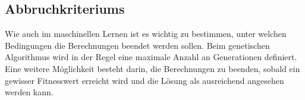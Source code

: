 %
%
%
%
\subsection{Abbruchkriteriums
\label{genetic_algorithm:termination}}
Wie auch im maschinellen Lernen ist es wichtig zu bestimmen, unter 
welchen Bedingungen die Berechnungen beendet werden sollen. Beim 
genetischen Algorithmus wird in der Regel eine maximale Anzahl an 
Generationen definiert. Eine weitere Möglichkeit besteht darin, 
die Berechnungen zu beenden, sobald ein gewisser Fitnesswert erreicht 
wird und die Lösung als ausreichend angesehen werden kann.

